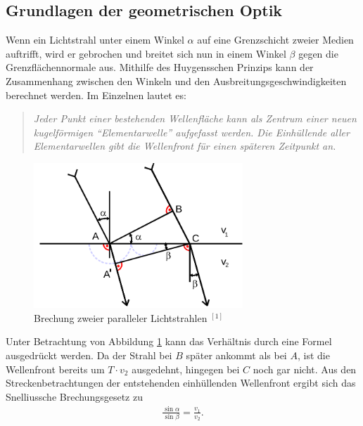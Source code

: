 \subsection{Grundlagen der geometrischen Optik}
Wenn ein Lichtstrahl unter einem Winkel $\alpha$ auf eine Grenzschicht zweier Medien auftrifft, wird er gebrochen und breitet sich nun
in einem Winkel $\beta$ gegen die Grenzflächennormale aus. Mithilfe des Huygensschen Prinzips kann der Zusammenhang zwischen den Winkeln
und den Ausbreitungsgeschwindigkeiten berechnet werden. Im Einzelnen lautet es:
\begin{quotation}
 \textit{Jeder Punkt einer bestehenden Wellenfläche kann als Zentrum einer neuen kugelförmigen ``Elementarwelle'' aufgefasst werden. Die Einhüllende aller Elementarwellen gibt die Wellenfront für einen späteren Zeitpunkt an.}
\end{quotation}
\begin{figure}[H]
 \includegraphics[width=0.7\textwidth]{pics/brechung.png}
 \caption{Brechung zweier paralleler Lichtstrahlen $^{[1]}$}
 \label{pic_snellius}
\end{figure}
Unter Betrachtung von Abbildung \ref{pic_snellius} kann das Verhältnis durch eine Formel ausgedrückt werden. Da der Strahl bei $B$ später
ankommt als bei $A$, ist die Wellenfront bereits um $T\cdot v_2$ ausgedehnt, hingegen bei $C$ noch gar nicht. Aus den Streckenbetrachtungen
der entstehenden einhüllenden Wellenfront ergibt sich das Snelliussche Brechungsgesetz zu
\begin{align}
 \frac{\sin \alpha}{\sin \beta} = \frac{v_1}{v_2}.
 \label{eq_snellius}
\end{align}
